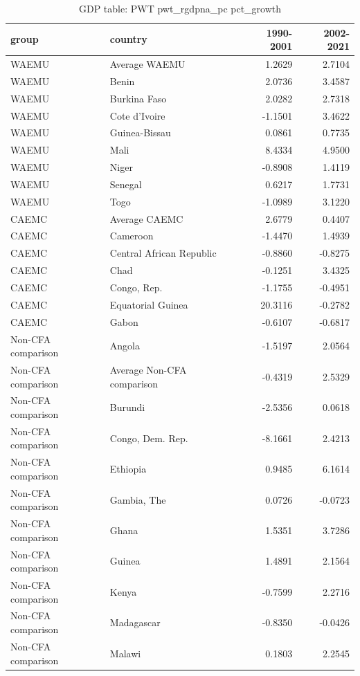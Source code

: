\begin{table}

\caption{GDP table: PWT pwt_rgdpna_pc pct_growth}
\centering
\begin{tabular}[t]{llrr}
\toprule
group & country & 1990-2001 & 2002-2021\\
\midrule
WAEMU & Average WAEMU & 1.2629 & 2.7104\\
WAEMU & Benin & 2.0736 & 3.4587\\
WAEMU & Burkina Faso & 2.0282 & 2.7318\\
WAEMU & Cote d'Ivoire & -1.1501 & 3.4622\\
WAEMU & Guinea-Bissau & 0.0861 & 0.7735\\
\addlinespace
WAEMU & Mali & 8.4334 & 4.9500\\
WAEMU & Niger & -0.8908 & 1.4119\\
WAEMU & Senegal & 0.6217 & 1.7731\\
WAEMU & Togo & -1.0989 & 3.1220\\
CAEMC & Average CAEMC & 2.6779 & 0.4407\\
\addlinespace
CAEMC & Cameroon & -1.4470 & 1.4939\\
CAEMC & Central African Republic & -0.8860 & -0.8275\\
CAEMC & Chad & -0.1251 & 3.4325\\
CAEMC & Congo, Rep. & -1.1755 & -0.4951\\
CAEMC & Equatorial Guinea & 20.3116 & -0.2782\\
\addlinespace
CAEMC & Gabon & -0.6107 & -0.6817\\
Non-CFA comparison & Angola & -1.5197 & 2.0564\\
Non-CFA comparison & Average Non-CFA comparison & -0.4319 & 2.5329\\
Non-CFA comparison & Burundi & -2.5356 & 0.0618\\
Non-CFA comparison & Congo, Dem. Rep. & -8.1661 & 2.4213\\
\addlinespace
Non-CFA comparison & Ethiopia & 0.9485 & 6.1614\\
Non-CFA comparison & Gambia, The & 0.0726 & -0.0723\\
Non-CFA comparison & Ghana & 1.5351 & 3.7286\\
Non-CFA comparison & Guinea & 1.4891 & 2.1564\\
Non-CFA comparison & Kenya & -0.7599 & 2.2716\\
\addlinespace
Non-CFA comparison & Madagascar & -0.8350 & -0.0426\\
Non-CFA comparison & Malawi & 0.1803 & 2.2545\\

\end{tabular}
\end{table}
